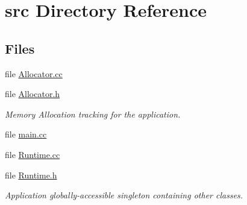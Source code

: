 \section{src Directory Reference}
\label{dir_68267d1309a1af8e8297ef4c3efbcdba}
\subsection*{Files}
\begin{DoxyCompactItemize}
\item 
file \hyperlink{_allocator_8cc}{Allocator.\-cc}
\item 
file \hyperlink{_allocator_8h}{Allocator.\-h}
\begin{DoxyCompactList}\small\item\em Memory Allocation tracking for the application. \end{DoxyCompactList}\item 
file \hyperlink{main_8cc}{main.\-cc}
\item 
file \hyperlink{_runtime_8cc}{Runtime.\-cc}
\item 
file \hyperlink{_runtime_8h}{Runtime.\-h}
\begin{DoxyCompactList}\small\item\em Application globally-\/accessible singleton containing other classes. \end{DoxyCompactList}\end{DoxyCompactItemize}
